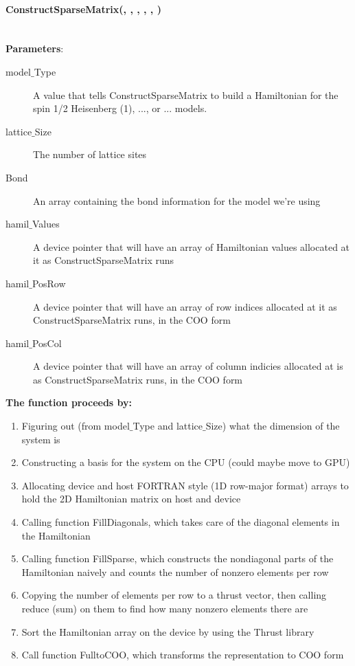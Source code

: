 \documentclass{article}
\begin{document}
{\paragraph{\host \int ConstructSparseMatrix(\int, \int, \ptrint, \cuDoubleComplex, \ptrint, \ptrint) \\ \\}
\noindent\textbf{Parameters}:
\begin{description}
\item[\int model$\_$Type] A value that tells ConstructSparseMatrix to build a Hamiltonian for the spin 1/2 Heisenberg (1), ..., or ... models.
\item[\int lattice$\_$Size] The number of lattice sites
\item[\ptrint Bond] An array containing the bond information for the model we're using 
\item[\cuDoubleComplex hamil$\_$Values] A device pointer that will have an array of Hamiltonian values allocated at it as ConstructSparseMatrix runs
\item[\ptrint hamil$\_$PosRow] A device pointer that will have an array of row indices allocated at it as ConstructSparseMatrix runs, in the COO form
\item[\ptrint hamil$\_$PosCol] A device pointer that will have an array of column indicies allocated at is as ConstructSparseMatrix runs, in the COO form
\end{description}

\noindent\textbf{The function proceeds by:}
\begin{enumerate}
\item{Figuring out (from model$\_$Type and lattice$\_$Size) what the dimension of the system is}
\item{Constructing a basis for the system on the CPU (could maybe move to GPU)}
\item{Allocating device and host FORTRAN style (1D row-major format) arrays to hold the 2D Hamiltonian matrix on host and device}
\item{Calling function FillDiagonals, which takes care of the diagonal elements in the Hamiltonian}
\item{Calling function FillSparse, which constructs the nondiagonal parts of the Hamiltonian naively and counts the number of nonzero elements per row}
\item{Copying the number of elements per row to a thrust vector, then calling reduce (sum) on them to find how many nonzero elements there are}
\item{Sort the Hamiltonian array on the device by using the Thrust library}
\item{Call function FulltoCOO, which transforms the representation to COO form}
\end{enumerate}

}
\end{document}
